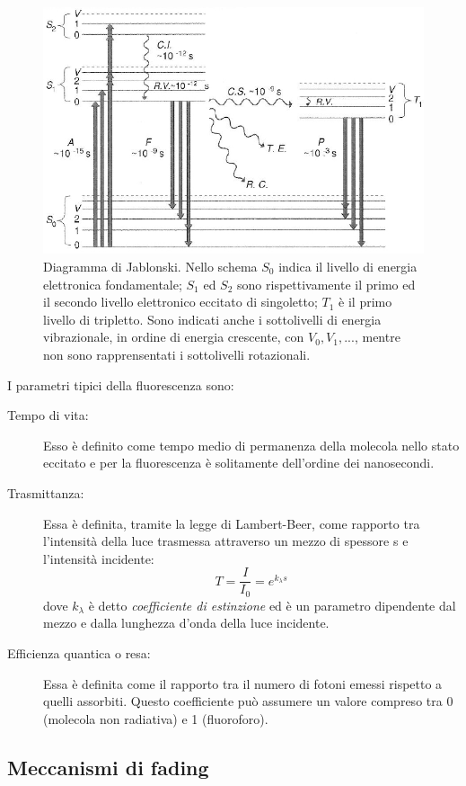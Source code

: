 \begin{figure}
 \centering
 \includegraphics[scale=.45]{img/CAP1jablonski.JPG}
 \caption{\small{Diagramma di Jablonski. Nello schema $S_0$ indica il livello di energia elettronica fondamentale; $S_1$ ed $S_2$ sono rispettivamente il primo ed il secondo livello elettronico eccitato di singoletto; $T_1$ è il primo livello di tripletto. Sono indicati anche i sottolivelli di energia vibrazionale, in ordine di energia crescente, con $V_0, V_1, ...$, mentre non sono rapprensentati i sottolivelli rotazionali.}}
 \label{fig:jablonski}
\end{figure}

I parametri tipici della fluorescenza sono:
\begin{description}
\item [Tempo di vita:]
Esso è definito come tempo medio di permanenza della molecola nello stato eccitato e per la fluorescenza è solitamente dell'ordine dei nanosecondi.
\item [Trasmittanza:]
Essa è definita, tramite la legge di Lambert-Beer, come rapporto tra l'intensità della luce trasmessa attraverso un mezzo di spessore s e l'intensità incidente: $$ T=\frac{I}{I_0} = e^ {k_\lambda s}$$ dove $k_\lambda$ è detto \textit{coefficiente di estinzione} ed è un parametro dipendente dal mezzo e dalla lunghezza d'onda della luce incidente.
\item [Efficienza quantica o resa:] 
Essa è definita come il rapporto tra il numero di fotoni emessi rispetto a quelli assorbiti. 
Questo coefficiente può assumere un valore compreso tra 0 (molecola non radiativa) e 1 (fluoroforo).
\end{description}


\subsection{Meccanismi di fading}

